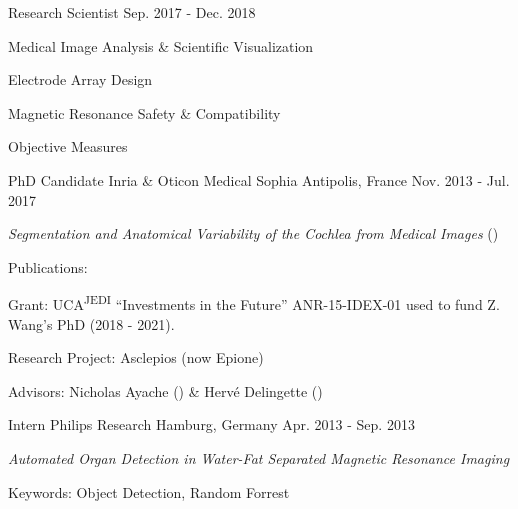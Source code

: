 \begin{cventries}
  \cventry
    {Research Scientist} %
    {} %
    {} %
    {Sep. 2017 - Dec. 2018} %
    {
      \begin{cvitems} %
        \item {Medical Image Analysis \& Scientific Visualization \hyperlink{DVG+19}{\honordatestyle{[DVG+19,}}\hyperlink{DVG+18b}{\honordatestyle{~DVG+18b]}}}
        \item {Electrode Array Design \hyperlink{MDH+19}{\honordatestyle{[MDH+19,}}\hyperlink{DVG+18a}{\honordatestyle{~DVG+18a]}}}
        \item {Magnetic Resonance Safety \& Compatibility \hyperlink{MH18}{\honordatestyle{[MH18]}}}
        \item {Objective Measures \hyperlink{RHD+18}{\honordatestyle{[RHD+18]}}}
      \end{cvitems}
    }

  \cventry
    {PhD Candidate} %
    {Inria \& Oticon Medical} %
    {Sophia Antipolis, France} %
    {Nov. 2013 - Jul. 2017} %
    {
      \begin{cvitems} %
        \item {\textit{Segmentation and Anatomical Variability of the Cochlea from Medical Images} ()}
        \item {Publications: \hyperlink{VDR+15}{\honordatestyle{[VDR+15,}}\hyperlink{GDV+16}{}\hyperlink{DVR+16}{}\hyperlink{DVG+17}{}\hyperlink{DWV+20}{\honordatestyle{~DWV+20]}}}
        \item {Grant: UCA\textsuperscript{JEDI} “Investments in the Future” ANR-15-IDEX-01 used to fund Z. Wang's PhD (2018 - 2021).}
        \item {Research Project: Asclepios (now Epione)}
        \item {Advisors: Nicholas Ayache () \& Hervé Delingette ()}
      \end{cvitems}
    }

  \cventry
    {Intern} %
    {Philips Research} %
    {Hamburg, Germany} %
    {Apr. 2013 - Sep. 2013} %
    {
      \begin{cvitems} %
        \item {\textit{Automated Organ Detection in Water-Fat Separated Magnetic Resonance Imaging} \hyperlink{DSS14}{\honordatestyle{[DSS14]}}}
        \item {Keywords: Object Detection, Random Forrest}
      \end{cvitems}
    }


\end{cventries}
